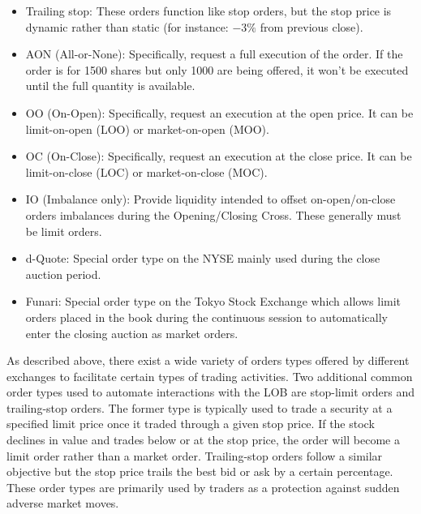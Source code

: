 \begin{itemize}
\item  Trailing stop: These orders function like stop orders, but the stop price is dynamic rather than static (for instance: $-3\%$ from previous close).

\item  AON (All-or-None): Specifically, request a full execution of the order. If the order is for 1500 shares but only 1000 are being offered, it won't be executed until the full quantity is available.

\item  OO (On-Open): Specifically, request an execution at the open price. It can be limit-on-open (LOO) or market-on-open (MOO).

\item  OC (On-Close): Specifically, request an execution at the close price. It can be limit-on-close (LOC) or market-on-close (MOC).

\item  IO (Imbalance only): Provide liquidity intended to offset on-open/on-close orders imbalances during the Opening/Closing Cross. These generally must be limit orders.

\item  d-Quote: Special order type on the NYSE mainly used during the close auction period.

\item  Funari: Special order type on the Tokyo Stock Exchange which allows limit orders placed in the book during the continuous session to automatically enter the closing auction as market orders. 
\end{itemize}


As described above, there exist a wide variety of orders types offered by different exchanges to facilitate certain types of trading activities. Two additional common order types used to automate interactions with the LOB are stop-limit orders and trailing-stop orders. The former type is typically used to trade a security at a specified limit price once it traded through a given stop price. If the stock declines in value and trades below or at the stop price, the order will become a limit order rather than a market order. Trailing-stop orders follow a similar objective but the stop price trails the best bid or ask by a certain percentage. These order types are primarily used by traders as a protection against sudden adverse market moves. \twomedskip


